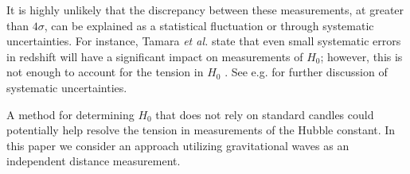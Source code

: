 It is highly unlikely that the discrepancy between these measurements, at greater than $4\sigma$, can be explained as a statistical fluctuation or through systematic uncertainties.
For instance, Tamara \textit{et al.} state that even small systematic errors in redshift will have a significant impact on measurements of $H_0$; however, this is not enough to account for the tension in $H_0$ \cite{Davis_2019}.
See e.g. \cite{Efstathiou_2021,Calabrese_2008} for further discussion of systematic uncertainties.

A method for determining $H_0$ that does not rely on standard candles could potentially help resolve the tension in measurements of the Hubble constant.
In this paper we consider an approach utilizing gravitational waves as an independent distance measurement.





